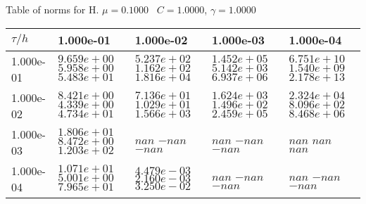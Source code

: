\begin{center}
Table of norms for H. $\mu = 0.1000$ \, $C = 1.0000$, $\gamma = 1.0000$
  
\begin{tabular}{|p{1in}|p{1in}|p{1in}|p{1in}|p{1in}|} \hline
$\tau / h$ &1.000e-01 &1.000e-02 &1.000e-03 &1.000e-04 \\ \hline 
1.000e-01 & $9.659e+00$  $5.958e+00$  $5.483e+01$  & $5.237e+02$  $1.162e+02$  $1.816e+04$  & $1.452e+05$  $5.142e+03$  $6.937e+06$  & $6.751e+10$  $1.540e+09$  $2.178e+13$  \\ \hline 
1.000e-02 & $8.421e+00$  $4.339e+00$  $4.734e+01$  & $7.136e+01$  $1.029e+01$  $1.566e+03$  & $1.624e+03$  $1.496e+02$  $2.459e+05$  & $2.324e+04$  $8.096e+02$  $8.468e+06$  \\ \hline 
1.000e-03 & $1.806e+01$  $8.472e+00$  $1.203e+02$  & $nan$  $-nan$  $-nan$  & $nan$  $-nan$  $-nan$  & $nan$  $nan$  $nan$  \\ \hline 
1.000e-04 & $1.071e+01$  $5.001e+00$  $7.965e+01$  & $4.479e-03$  $2.160e-03$  $3.250e-02$  & $nan$  $-nan$  $-nan$  & $nan$  $-nan$  $-nan$  \\ \hline 

\end{tabular}\\[20pt]
\end{center}
